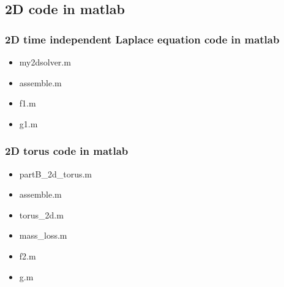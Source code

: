 \documentclass[12pt]{article}
\begin{document}
\subsection{2D code in matlab}
\doublespacing
\subsubsection{2D time independent Laplace equation code in matlab}

\singlespacing
\begin{itemize}

\item{\large my2dsolver.m}

\vspace{1cm}

\item{\large assemble.m}

\vspace{1cm}

\item{\large f1.m}

\vspace{1cm}
\item{\large g1.m}

\vspace{1cm}

\end{itemize}


\subsubsection{2D torus code in matlab}

\singlespacing
\begin{itemize}

\item{\large partB{\_}2d{\_}torus.m}

\vspace{1cm}

\item{\large assemble.m}

\vspace{1cm}

\item{\large torus{\_}2d.m}

\vspace{1cm}

\item{\large mass{\_}loss.m}

\vspace{1cm}

\item{\large f2.m}

\vspace{1cm}

\item{\large g.m}

\vspace{1cm}

\end{itemize}
\end{document}
